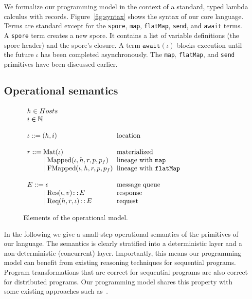\documentclass[preprint]{sigplanconf}
\theoremstyle{definition}
\theoremstyle{definition}
\newcommand{\gap}{\quad\quad}
\newcommand{\ba}{\begin{array}}
\newcommand{\ea}{\end{array}}
\begin{document}
We formalize our programming model in the context of a standard, typed lambda calculus with records. Figure~\ref{fig:syntax} shows the syntax of our core language. Terms are standard except for the \texttt{spore}, \texttt{map}, \texttt{flatMap}, \texttt{send}, and \texttt{await} terms. A \texttt{spore} term creates a new spore. It contains a list of variable definitions (the spore header) and the spore's closure. A term $\texttt{await}(\iota)$ blocks execution until the future $\iota$ has been completed asynchronously. The \texttt{map}, \texttt{flatMap}, and \texttt{send} primitives have been discussed earlier.


\subsection{Operational semantics}\label{sec:opsem}

\begin{figure}[ht!]
  \centering

  $\ba[t]{l@{\hspace{2mm}}l}
h \in Hosts &
\\
i \in \mathbb{N} &
\\
 & \\
\iota  ::=  (h, i)                             & \mbox{location}
\\
 & \\
r ::=     \text{Mat}(\iota) & \mbox{materialized}
\\
\gap ~|~  \text{Mapped}(\iota, h, r, p, p_f)   & \mbox{lineage with \texttt{map}}
\\
\gap ~|~  \text{FMapped}(\iota, h, r, p, p_f)  & \mbox{lineage with \texttt{flatMap}}
\\
 & \\
E      ::=  \epsilon & \mbox{message queue}
\\
\gap ~|~    \text{Res}(\iota, v) \texttt{::} E     & \mbox{response}
\\
\gap ~|~    \text{Req}(h, r, \iota) \texttt{::} E  & \mbox{request}
\\
  \ea$

  \vspace{1mm}
  \caption{Elements of the operational model.}
  \label{fig:elems-opsem}
  \vspace{1mm}
\end{figure}

In the following we give a small-step operational semantics of the primitives of our language. The semantics is clearly stratified into a deterministic layer and a non-deterministic (concurrent) layer. Importantly, this means our programming model can benefit from existing reasoning techniques for sequential programs. Program transformations that are correct for sequential programs are also correct for distributed programs. Our programming model shares this property with some existing approaches such as~\cite{ConcurrentHaskell}.
\end{document}
